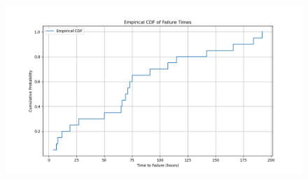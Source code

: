 \begin{hwkProblem}{1}{}
	\begin{figure}[H]
		\centering
		\includegraphics[width=\textwidth]{./images/s01b2.png}
	\end{figure}

	

\end{hwkProblem}


